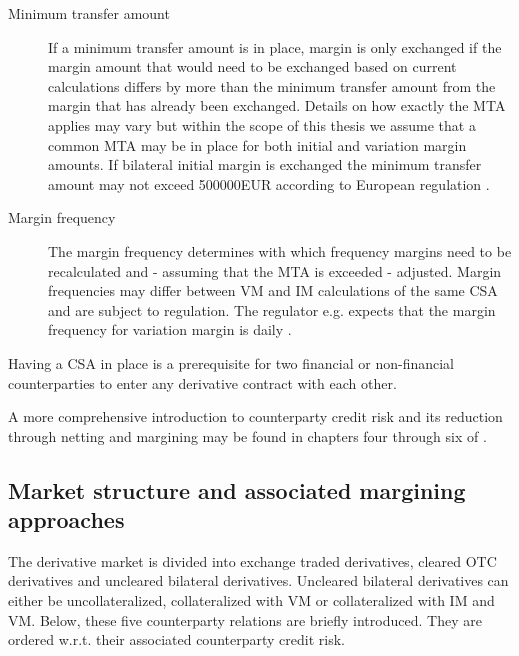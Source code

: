 \documentclass[../Thesis_AHoecherl.tex]{subfiles}
\begin{document}
\begin{description}
    \item[Minimum transfer amount]
    If a minimum transfer amount is in place, margin is only exchanged if the margin amount that would need to be exchanged based on current calculations differs by more than the minimum transfer amount from the margin that has already been exchanged.
    Details on how exactly the \gls{MTA} applies may vary but within the scope of this thesis we assume that a common \gls{MTA} may be in place for both initial and variation margin amounts. If bilateral initial margin is exchanged the minimum transfer amount may not exceed 500000EUR according to European regulation \cite[Requirement 2.3]{BCBS_MarginRequirements}.  
    \item[Margin frequency]
    The margin frequency determines with which frequency margins need to be recalculated and - assuming that the \gls{MTA} is exceeded - adjusted. Margin frequencies may differ between \gls{VM} and \gls{IM} calculations of the same \gls{CSA} and are subject to regulation. The regulator e.g. expects that the margin frequency for variation margin is daily \cite[Requirement 3.14]{BCBS_MarginRequirements}.
\end{description}

Having a \gls{CSA} in place is a prerequisite for two financial or non-financial counterparties to enter any derivative contract with each other.

A more comprehensive introduction to counterparty credit risk and its reduction through netting and margining may be found in chapters four through six of \cite{gregory2015xva}.

\subsection{Market structure and associated margining approaches}\label{sec:Market strucutre and associated margining approaches}

The derivative market is divided into exchange traded derivatives, cleared \gls{OTC} derivatives and uncleared bilateral derivatives. Uncleared bilateral derivatives can either be uncollateralized, collateralized with \gls{VM} or collateralized with \gls{IM} and \gls{VM}. Below, these five counterparty relations are briefly introduced. They are ordered w.r.t. their associated counterparty credit risk.
\end{document}
